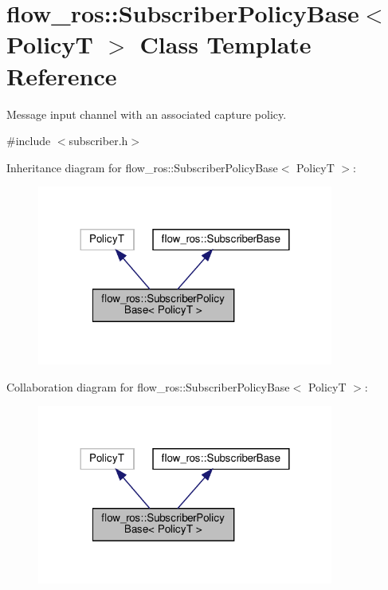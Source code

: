 \hypertarget{classflow__ros_1_1_subscriber_policy_base}{}\section{flow\+\_\+ros\+:\+:Subscriber\+Policy\+Base$<$ PolicyT $>$ Class Template Reference}
\label{classflow__ros_1_1_subscriber_policy_base}


Message input channel with an associated capture policy.  




{\ttfamily \#include $<$subscriber.\+h$>$}



Inheritance diagram for flow\+\_\+ros\+:\+:Subscriber\+Policy\+Base$<$ PolicyT $>$\+:\nopagebreak
\begin{figure}[H]
\begin{center}
\leavevmode
\includegraphics[width=276pt]{classflow__ros_1_1_subscriber_policy_base__inherit__graph}
\end{center}
\end{figure}


Collaboration diagram for flow\+\_\+ros\+:\+:Subscriber\+Policy\+Base$<$ PolicyT $>$\+:\nopagebreak
\begin{figure}[H]
\begin{center}
\leavevmode
\includegraphics[width=276pt]{classflow__ros_1_1_subscriber_policy_base__coll__graph}
\end{center}
\end{figure}
